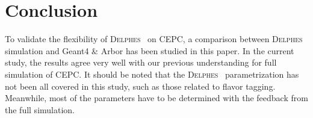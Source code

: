 \documentclass[a4paper,10pt,twoside]{cpc-hepnp}
\begin{document}
\section{Conclusion\label{sec:conclusion}}
To validate the flexibility of {\textsc{Delphes}~} on CEPC, a comparison between {\textsc{Delphes}~} simulation and Geant4 \& Arbor has been studied in this paper. In the current study, the results agree very well with our previous understanding for full simulation of CEPC. It should be noted that the {\textsc{Delphes}~} parametrization has not been all covered in this study, such as those related to flavor tagging. Meanwhile, most of the parameters have to be determined with the feedback from the full simulation.
\vspace{3mm}

\begin{thebibliography}{90}

\vspace{3mm}


\end{thebibliography}
\end{document}
